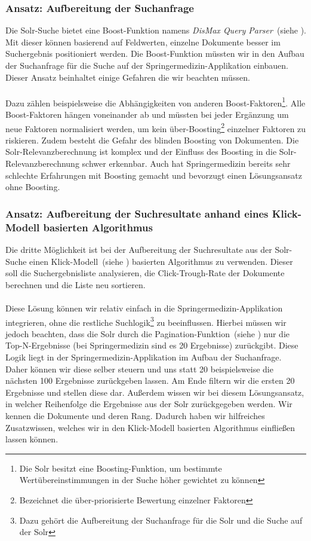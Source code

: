 \subsubsection{Ansatz: Aufbereitung der Suchanfrage}
\label{sec:Reranking:Methodik:SucheEinbinden:Suchanfrage}

Die Solr-Suche bietet eine Boost-Funktion namens \textit{DisMax Query Parser}~(siehe \cite{DisMax}). Mit dieser können basierend auf Feldwerten, einzelne Dokumente besser im Suchergebnis positioniert werden. Die Boost-Funktion müssten wir in den Aufbau der Suchanfrage für die Suche auf der Springermedizin-Applikation einbauen. Dieser Ansatz beinhaltet einige Gefahren die wir beachten müssen.
\\
\\
Dazu zählen beispielsweise die Abhängigkeiten von anderen Boost-Faktoren\footnote{Die Solr besitzt eine Boosting-Funktion, um bestimmte Wertübereinstimmungen in der Suche höher gewichtet zu können}. Alle Boost-Faktoren hängen voneinander ab und müssten bei jeder Ergänzung um neue Faktoren normalisiert werden, um kein \glqq über-Boosting\grqq{}\footnote{Bezeichnet die über-priorisierte Bewertung einzelner Faktoren} einzelner Faktoren zu riskieren. Zudem besteht die Gefahr des \glqq blinden Boosting\grqq{} von Dokumenten. Die Solr-Relevanzberechnung ist komplex und der Einfluss des \glqq Boosting\grqq{} in die Solr-Relevanzberechnung schwer erkennbar. Auch hat Springermedizin bereits sehr schlechte Erfahrungen mit \glqq Boosting\grqq{} gemacht und bevorzugt einen Lösungsansatz ohne \glqq Boosting\grqq{}.

\subsubsection{Ansatz: Aufbereitung der Suchresultate anhand eines Klick-Modell basierten Algorithmus}
\label{sec:Reranking:Methodik:SucheEinbinden:Suchresultate}

Die dritte Möglichkeit ist bei der Aufbereitung der Suchresultate aus der Solr-Suche einen Klick-Modell~(siehe \cite{pbm}) basierten Algorithmus zu verwenden. Dieser soll die Suchergebnisliste analysieren, die Click-Trough-Rate der Dokumente berechnen und die Liste neu sortieren. 
\\
\\
Diese Lösung können wir relativ einfach in die Springermedizin-Applikation integrieren, ohne die restliche Suchlogik\footnote{Dazu gehört die Aufbereitung der Suchanfrage für die Solr und die Suche auf der Solr} zu beeinflussen. Hierbei müssen wir jedoch beachten, dass die Solr durch die Pagination-Funktion~(siehe \cite{Pagination}) nur die Top-N-Ergebnisse (bei Springermedizin sind es 20 Ergebnisse) zurückgibt. Diese Logik liegt in der Springermedizin-Applikation im Aufbau der Suchanfrage. Daher können wir diese selber steuern und uns statt 20 beispielsweise die nächsten 100 Ergebnisse zurückgeben lassen. Am Ende filtern wir die ersten 20 Ergebnisse und stellen diese dar. Außerdem wissen wir bei diesem Lösungsansatz, in welcher Reihenfolge die Ergebnisse aus der Solr zurückgegeben werden. Wir kennen die Dokumente und deren Rang. Dadurch haben wir hilfreiches Zusatzwissen, welches wir in den Klick-Modell basierten Algorithmus einfließen lassen können.

